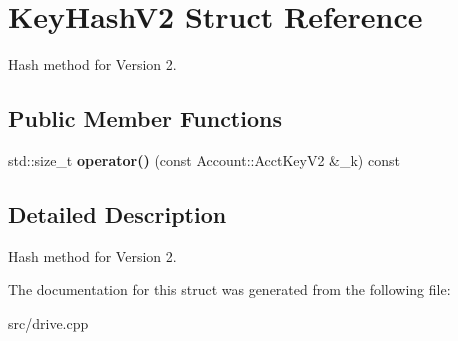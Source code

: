 \hypertarget{structKeyHashV2}{}\section{Key\+Hash\+V2 Struct Reference}
\label{structKeyHashV2}


Hash method for Version 2.  


\subsection*{Public Member Functions}
\begin{DoxyCompactItemize}
\item 
std\+::size\+\_\+t {\bfseries operator()} (const Account\+::\+Acct\+Key\+V2 \&\+\_\+k) const \hypertarget{structKeyHashV2_af2a483fcbab5940e8fa3d1046ec91578}{}\label{structKeyHashV2_af2a483fcbab5940e8fa3d1046ec91578}

\end{DoxyCompactItemize}


\subsection{Detailed Description}
Hash method for Version 2. 

The documentation for this struct was generated from the following file\+:\begin{DoxyCompactItemize}
\item 
src/drive.\+cpp\end{DoxyCompactItemize}
